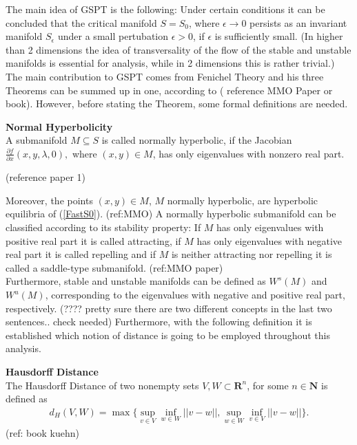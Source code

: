 
The main idea of GSPT is the following: Under certain conditions it can be concluded that the critical manifold $S=S_0$, where $\epsilon \to 0$ persists as an invariant manifold $S_{\epsilon}$ under a small pertubation $\epsilon >0$, if $\epsilon$ is sufficiently small. 
(In higher than 2 dimensions the idea of transversality of the flow of the stable and unstable manifolds is essential for analysis, while in 2 dimensions this is rather trivial.)
The main contribution to GSPT comes from Fenichel Theory and his three Theorems can be summed up in one, according to ( reference MMO Paper or book).
However, before stating the Theorem, some formal definitions are needed.

\begin{definition}{\textbf{Normal Hyperbolicity}} \label{NormHyp}
	\\
	A submanifold $M \subseteq S$ is called normally hyperbolic, if the Jacobian $ \frac{\partial f}{\partial x}(x,y, \lambda, 0),$ where $(x,y) \in M$, has only eigenvalues with nonzero real part.
\end{definition} (reference paper 1)

Moreover, the points $(x,y) \in M$, $M$ normally hyperbolic, are hyperbolic equilibria of (\ref{FastS0}). (ref:MMO)
A normally hyperbolic submanifold can be classified according to its stability property: If $M$ has only eigenvalues with positive real part it is called attracting, if $M$ has only eigenvalues with negative real part it is called repelling and if $M$ is neither attracting nor repelling it is called a saddle-type submanifold. (ref:MMO paper) \\
Furthermore, stable and unstable manifolds can be defined as $W^s(M)$  and $W^u(M)$, corresponding to the eigenvalues with negative and positive real part, respectively.
(???? pretty sure there are two different concepts in the last two sentences.. check needed)
Furthermore, with the following definition it is established which notion of distance is going to be employed throughout this analysis.

\begin{definition}{\textbf{Hausdorff Distance}}\\
	The Hausdorff Distance of two nonempty sets $V,W \subset \mathbf{R}^n$, for some $n \in \mathbf{N}$ 
	is defined as 
	\begin{align*}
	d_H(V,W)= \max \{ \sup_{v \in V} \inf_{w \in W} || v- w ||, \sup_ {w \in W}\inf_{v \in V} || v- w ||\}.
	\end{align*}
	(ref: book kuehn)
\end{definition}

